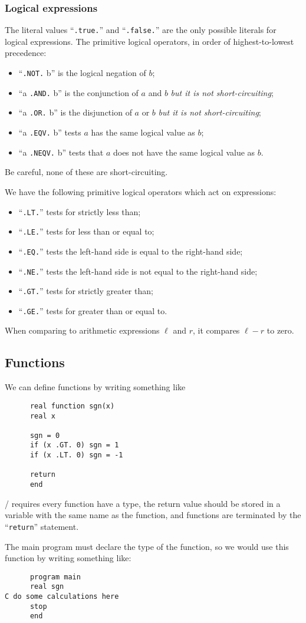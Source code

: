 \subsubsection{Logical expressions}
The literal values ``\texttt{.true.}'' and ``\texttt{.false.}'' are the
only possible literals for logical expressions. The primitive logical
operators, in order of highest-to-lowest precedence:
\begin{itemize}
\item ``\texttt{.NOT.} b'' is the logical negation of $b$;
\item ``a \texttt{.AND.} b'' is the conjunction of $a$ and $b$ \emph{but it is not short-circuiting};
\item ``a \texttt{.OR.} b'' is the disjunction of $a$ or $b$ \emph{but it is not short-circuiting};
\item ``a \texttt{.EQV.} b'' tests $a$ has the same logical value as $b$;
\item ``a \texttt{.NEQV.} b'' tests that $a$ does not have the same
  logical value as $b$.
\end{itemize}
Be careful, none of these are short-circuiting.

We have the following primitive logical operators which act on expressions:
\begin{itemize}
\item ``\texttt{.LT.}'' tests for strictly less than;
\item ``\texttt{.LE.}'' tests for less than or equal to;
\item ``\texttt{.EQ.}'' tests the left-hand side is equal to the
  right-hand side;
\item ``\texttt{.NE.}'' tests the left-hand side is not equal to the
  right-hand side;
\item ``\texttt{.GT.}'' tests for strictly greater than;
\item ``\texttt{.GE.}'' tests for greater than or equal to.
\end{itemize}
When comparing to arithmetic expressions $\ell$ and $r$, it compares
$\ell-r$ to zero.

\subsection{Functions}
We can define functions by writing something like

\begin{lstlisting}
      real function sgn(x)
      real x

      sgn = 0
      if (x .GT. 0) sgn = 1
      if (x .LT. 0) sgn = -1

      return
      end
\end{lstlisting}
\FORTRAN/ requires every function have a type, the return value should
be stored in a variable with the same name as the function, and
functions are terminated by the ``\texttt{return}'' statement.

The main program must declare the type of the function, so we would use
this function by writing something like:
\begin{lstlisting}
      program main
      real sgn
C do some calculations here
      stop
      end
\end{lstlisting}



